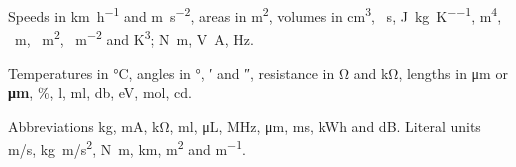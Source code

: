 \documentclass{article}
\begin{document}
Speeds in \si{\kilo\metre\per\hour} and \si{\metre\per\second\squared}, areas in \si{\square\metre},
volumes in \unit{\cubic\centi\metre}, \si{\per\second}, \si{\joule\per\kilogram\per\kelvin}, \si{\metre\tothe{4}},
\si{\metre}, \si{\per\square\metre}, \si{\per\metre\tothe{-2}} and \si{\kelvin\cubed}; \si{\newton\metre}, \si{\volt\ampere}, \si{\hertz}.

Temperatures in \si{\degreeCelsius}, angles in \si{\degree}, \si{\arcminute} and \si{\arcsecond},
resistance in \si{\ohm} and \si{\kilo\ohm}, lengths in \si{\micro\metre} or \textbf{\si{\micro\metre}},
\si{\percent}, \si{\litre}, \si{\milli\litre}, \si{\decibel}, \si{\electronvolt}, \si{\mole}, \si{\candela}.

Abbreviations \si{\kg}, \si{\mA}, \si{\kohm}, \si{\ml}, \si{\uL}, \si{\MHz}, \si{\um}, \si{\ms}, \si{\kWh} and \si{\dB}.
Literal units \si{m/s}, \si{kg.m/s^2}, \si{N~m}, \si{km}, \si{m^2} and \si{m^{-1}}.
\end{document}
